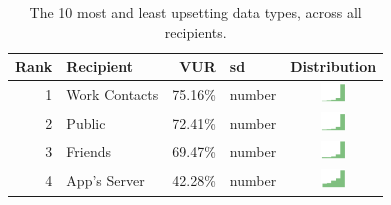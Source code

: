 \begin{table}[t]
\begin{center}
\small
\begin{tabular}{| r | l | r | l |c |}
\hline
Rank & Recipient & VUR & sd & Distribution \\
\hline
1 & Work Contacts & 75.16\% & number & \includegraphics[width = 2cm, height = 0.5cm]{tex-inputs/recipient4/recipient_work} \\
2 & Public & 72.41\% & number & \includegraphics[width = 2cm, height = 0.5cm]{tex-inputs/recipient4/recipient_pub}  \\
3 & Friends & 69.47\% & number & \includegraphics[width = 2cm, height = 0.5cm]{tex-inputs/recipient4/recipient_friends}\\
4 & App's Server & 42.28\% & number & \includegraphics[width = 2cm, height = 0.5cm]{tex-inputs/recipient4/recipient_app}\\
\hline
\end{tabular}
\caption{The 10 most and least upsetting data types, across all recipients.}
\label{recipient-table}
\end{center}
\end{table}

